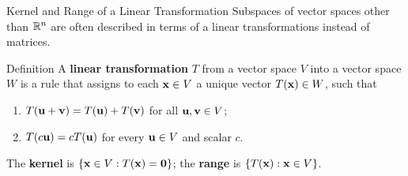   

\begin{frame}{Kernel and Range of a Linear Transformation}
Subspaces of vector spaces other than $\mathbb{R}^n$ are often described in terms of a linear transformations instead of matrices.
\begin{block}{Definition}
A {\color{lectureblue}\textbf{linear transformation} $T$} from a vector space $V$ into a vector space $W$ is a rule that assigns to each $\mathbf{x}\in V$ a unique vector $T(\mathbf{x})\in W$, such that
\begin{enumerate}
\item $T(\mathbf{u}+\mathbf{v})=T(\mathbf{u})+T(\mathbf{v})$ for all $\mathbf{u},\mathbf{v}\in V$;
\item $T(c\mathbf{u})=cT(\mathbf{u})$ for every $\mathbf{u}\in V$ and scalar $c$.
\end{enumerate}
\end{block}
The \textbf{kernel} is $\{\mathbf{x}\in V:T(\mathbf{x})=\mathbf{0}\}$; the
\textbf{range} is $\{T(\mathbf{x}):\mathbf{x}\in V\}$.
\end{frame}

